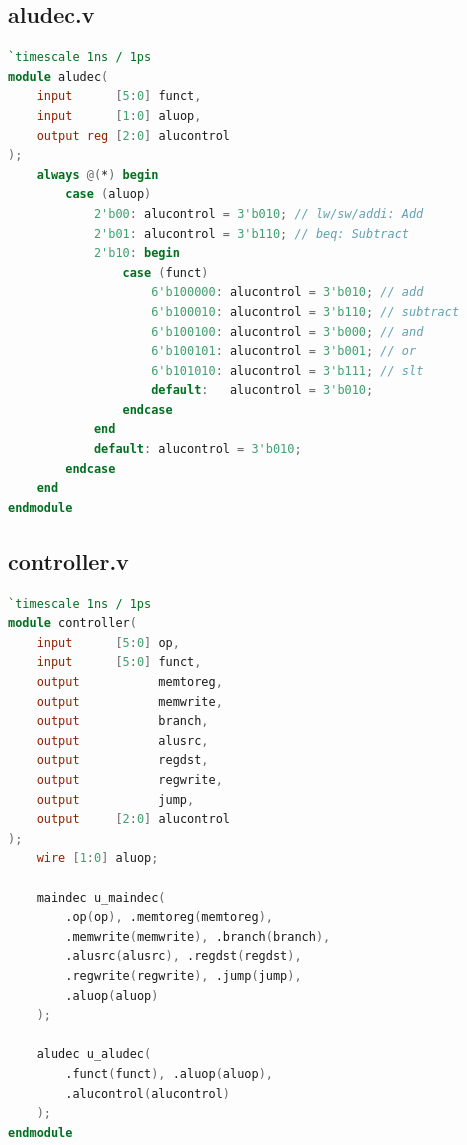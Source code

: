\subsection{aludec.v}
\begin{lstlisting}[language=Verilog]
`timescale 1ns / 1ps
module aludec(
    input      [5:0] funct,
    input      [1:0] aluop,
    output reg [2:0] alucontrol
);
    always @(*) begin
        case (aluop)
            2'b00: alucontrol = 3'b010; // lw/sw/addi: Add
            2'b01: alucontrol = 3'b110; // beq: Subtract
            2'b10: begin
                case (funct)
                    6'b100000: alucontrol = 3'b010; // add
                    6'b100010: alucontrol = 3'b110; // subtract
                    6'b100100: alucontrol = 3'b000; // and
                    6'b100101: alucontrol = 3'b001; // or
                    6'b101010: alucontrol = 3'b111; // slt
                    default:   alucontrol = 3'b010;
                endcase
            end
            default: alucontrol = 3'b010;
        endcase
    end
endmodule
\end{lstlisting}

\subsection{controller.v}
\begin{lstlisting}[language=Verilog]
`timescale 1ns / 1ps
module controller(
    input      [5:0] op,
    input      [5:0] funct,
    output           memtoreg,
    output           memwrite,
    output           branch,
    output           alusrc,
    output           regdst,
    output           regwrite,
    output           jump,
    output     [2:0] alucontrol
);
    wire [1:0] aluop;

    maindec u_maindec(
        .op(op), .memtoreg(memtoreg),
        .memwrite(memwrite), .branch(branch),
        .alusrc(alusrc), .regdst(regdst),
        .regwrite(regwrite), .jump(jump),
        .aluop(aluop)
    );

    aludec u_aludec(
        .funct(funct), .aluop(aluop),
        .alucontrol(alucontrol)
    );
endmodule
\end{lstlisting}
